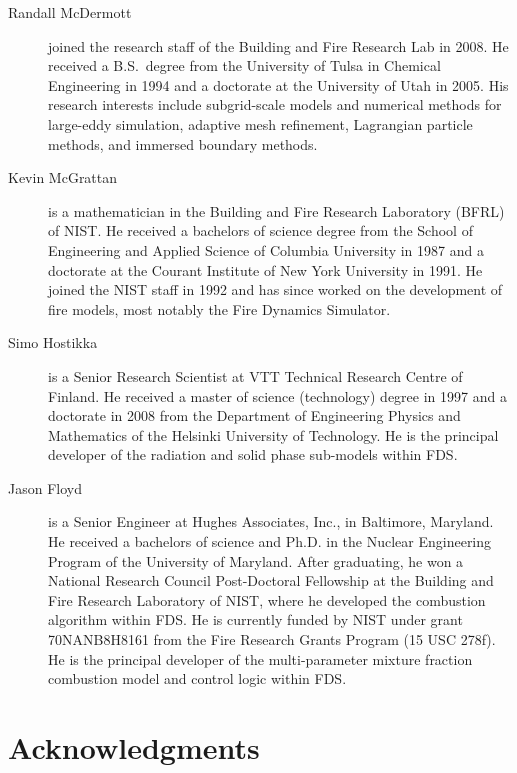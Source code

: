\documentclass[11pt]{book}
\begin{document}
\begin{description}
\item[Randall McDermott] joined the research staff of the Building and Fire Research Lab in 2008. He received a B.S.~degree from the University of Tulsa in Chemical Engineering in 1994 and a doctorate at the University of Utah in 2005. His research interests include subgrid-scale models and numerical methods for large-eddy simulation, adaptive mesh refinement, Lagrangian particle methods, and immersed boundary methods.
\item[Kevin McGrattan] is a mathematician in the Building and Fire Research Laboratory (BFRL) of NIST. He received a bachelors of science degree from the School of Engineering and Applied Science of Columbia University in 1987 and a doctorate at the Courant Institute of New York University in 1991. He joined the NIST staff in 1992 and has since worked on the development of fire models, most notably the Fire Dynamics Simulator.
\item[Simo Hostikka] is a Senior Research Scientist at VTT Technical Research Centre of Finland. He received a master of science (technology) degree in 1997 and a doctorate in 2008 from the Department of Engineering Physics and Mathematics of the Helsinki University of Technology.  He is the principal developer of the radiation and solid phase sub-models within FDS.
\item[Jason Floyd] is a Senior Engineer at Hughes Associates, Inc., in Baltimore, Maryland. He received a bachelors of science and Ph.D. in the Nuclear Engineering Program of the University of Maryland. After graduating, he won a National Research Council Post-Doctoral Fellowship at the Building and Fire Research Laboratory of NIST, where he developed the combustion algorithm within FDS. He is currently funded by NIST under grant 70NANB8H8161 from the Fire Research Grants Program (15 USC 278f). He is the principal developer of the multi-parameter mixture fraction combustion model and control logic within FDS.
\end{description}



\chapter{Acknowledgments}

\label{acksection}
\end{document}
